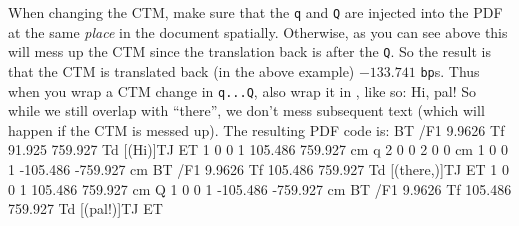 
When changing the CTM, make sure that the {\tt q} and {\tt Q} are injected into the PDF at the same 
{\it place} in the document spatially.
Otherwise, as you can see above this will mess up the CTM since the translation back is after the {\tt Q}.
So the result is that the CTM is translated back (in the above example) $-133.741$ {\tt bp}s.
Thus when you wrap a CTM change in {\tt q...Q}, also wrap it in \macro\rlap, like so:
\blisting
Hi,
%
pal!
\elisting
So while we still overlap with ``there'', we don't mess subsequent text (which will happen if the CTM
is messed up).
The resulting PDF code is:
\blisting {}
BT
/F1 9.9626 Tf 91.925 759.927 Td [(Hi)]TJ
ET
1 0 0 1 105.486 759.927 cm      %
q 2 0 0 2 0 0 cm
1 0 0 1 -105.486 -759.927 cm
BT
/F1 9.9626 Tf 105.486 759.927 Td [(there,)]TJ
ET
1 0 0 1 105.486 759.927 cm
Q
1 0 0 1 -105.486 -759.927 cm    %
BT
/F1 9.9626 Tf 105.486 759.927 Td [(pal!)]TJ
ET
\elisting

